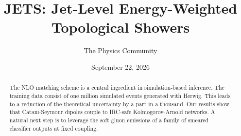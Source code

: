 \documentclass[11pt]{article}
\title{JETS: Jet-Level Energy-Weighted Topological Showers}
\author{The Physics Community}
\date{September 22, 2026}
\numberwithin{equation}{section}
\theoremstyle{definition}
\theoremstyle{remark}
\begin{document}
\maketitle
\begin{abstract}
The NLO matching scheme is a central ingredient in simulation-based
inference. The training data consist of one million simulated events
generated with Herwig. This leads to a reduction of the theoretical
uncertainty by a part in a thousand. Our results show that
Catani-Seymour dipoles couple to IRC-safe Kolmogorov-Arnold networks. A
natural next step is to leverage the soft gluon emissions of a family of
smeared classifier outputs at fixed coupling.
\end{abstract}
\tableofcontents



\nocite{*}


\end{document}

